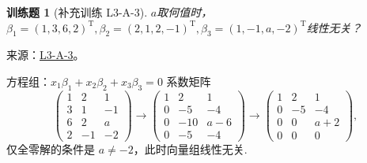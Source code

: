 \documentclass[12pt,fontset=fandol]{ctexart}
\newtheorem{exercise}{训练题}[section]
\begin{document}
\begin{exercise}[补充训练 L3-A-3]\label{prob:L3-A-3}
$a$取何值时，$\beta_1=(1,3,6,2)^\mathrm{T},\beta_2=(2,1,2,-1)^\mathrm{T},\beta_3=(1,-1,a,-2)^\mathrm{T}$线性无关？
\end{exercise}
\noindent 来源：\href{https://github.com/yhwu-is/Linear-Algebra-Left-Undone/blob/new/%E8%AE%B2%E4%B9%89/%E4%B8%93%E9%A2%98/3%20%E6%9C%89%E9%99%90%E7%BB%B4%E7%BA%BF%E6%80%A7%E7%A9%BA%E9%97%B4.tex}{L3-A-3}。
\begin{solve}
方程组：$x_1\beta_1+x_2\beta_2+x_3\beta_3=0$ 系数矩阵
            \[\begin{pmatrix}
                    1 & 2  & 1  \\
                    3 & 1  & -1 \\
                    6 & 2  & a  \\
                    2 & -1 &
                    -2\end{pmatrix}\rightarrow\begin{pmatrix}
                    1 & 2   & 1   \\
                    0 & -5  & -4  \\
                    0 & -10 & a-6 \\
                    0 & -5  & -4
                \end{pmatrix}\rightarrow\begin{pmatrix}
                    1 & 2  & 1   \\
                    0 & -5 & -4  \\
                    0 & 0  & a+2 \\
                    0 & 0  & 0
                \end{pmatrix},\]
            仅全零解的条件是 $a\neq-2$，此时向量组线性无关.
\end{solve}
\end{document}

